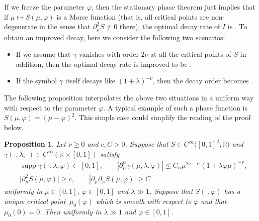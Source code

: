 \documentclass[10pt,a4paper]{article}
\numberwithin{equation}{section}
\newtheorem{Proposition}[Theorem]{Proposition}
 { \theoremstyle{definition}
\newtheorem{Definition}[Theorem]{Definition}
\newtheorem{Note}[Theorem]{Note}
\newtheorem{Example}[Theorem]{Example}
\newtheorem{Remark}[Theorem]{Remark} }
\def\R{\mathbb{R}}%
\DeclareMathOperator{\supp}{supp}%
\def\a{\alpha}
\def\c{\gamma}
\def\f{\varphi}
\def\l{\lambda}
\def\m{\mu}
\def\n{\nu}
\def\pa{\partial}
\begin{document}
If we freeze the parameter $\f$, then the stationary phase theorem just implies that if $\m\mapsto S(\m,\f)$ is a Morse function (that is, all critical points are non-degenerate in the sense that $\pa_{\m}^2S\neq 0$ there), the optimal decay rate of $I$ is \smash{$\l^{-\frac{1}{2}}$}. To obtain an improved decay, here we consider the following two scenarios:
\begin{itemize}\itemsep=0pt
\item If we assume that $\c$ vanishes with order $2\n$ at all the critical points of $S$ in addition, then the optimal decay rate is improved to be \smash{$\l^{-\frac{1}{2}-\n}$}.
\item If the symbol $\c$ itself decays like $(1+\l)^{-\n}$, then the decay order becomes \smash{$\l^{-\frac{1}{2}-\n}$}.
\end{itemize}
The following proposition interpolates the above two situations in a uniform way with respect to the parameter $\f$.
A typical example of such a phase function is $S(\m,\f)=(\m-\f)^2$. This simple case could simplify the reading of the proof below.

\begin{Proposition}\label{Stphasemovecrit}
Let $\n\geq 0$ and $c, C>0$. Suppose that $S\in C^{\infty}\bigl([0,1]^2;\R\bigr)$ and $\c(\cdot,\l,\cdot)\in C^{\infty}(\R\times [0,1])$ satisfy
\begin{align*}
&\supp \c(\cdot,\l,\f)\subset [0,1],\qquad |\pa_{\m}^{\a}\c(\m,\l,\f)|\leq C_{\a}\m^{2\n-\a}(1+\l \f\m)^{-\n},\\
&
\big|\pa_{\m}^2S(\m,\f)\big|\geq c,\qquad |\pa_{\m}\pa_{\f}S(\m,\f)|\geq C%
\end{align*}
uniformly in $\m\in [0,1]$, $\f\in [0,1]$ and $\l\gg 1$. Suppose that $S(\cdot,\f)$ has a unique critical point~${\m_0(\f)}$ which is smooth with respect to $\f$ and that $\m_0(0)=0$. Then
 \smash{$|I(\l,\f)|\lesssim \l^{-\n-\frac{1}{2}}$} uniformly in $\l\gg 1$ and $\f\in [0,1]$.
\end{Proposition}
\end{document}
